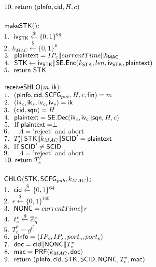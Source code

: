  $10.\  \mathsf{return}\ (\mathsf{pInfo}, \mathsf{cid}, H, c)$ \\
\\
\underline{$\mathsf{makeSTK}()$:} \\
 $1.\ \ \mathsf{iv}_{\mathsf{STK}} \xleftarrow{\$} \{0,1\}^{96}$ \\
 $2.\ \ k_{MAC} \xleftarrow{\$} \{0,1\}^{\mu}$ \\
 $3.\ \ \mathsf{plaintext} = IP_c \| currentTime \| k_{\mathsf{MAC}}$ \\
 $4.\ \ \mathsf{STK} \leftarrow \mathsf{iv}_{\mathsf{STK}} \| \mathsf{SE}.\mathsf{Enc}(k_{\mathsf{STK}}, len, \mathsf{iv}_{\mathsf{STK}}, \mathsf{plaintext})$ \\
 $5.\ \ \mathsf{return}\ \mathsf{STK}$ \\
\\
\underline{$\mathsf{receiveSHLO}(m, \mathsf{ik})$:} \\
 $1.\ \ (\mathsf{pInfo}, \mathsf{cid}, \mathsf{SCFG}_{pub}, H, c, \mathsf{fin}) = m$ \\
 $2.\ \ (\mathsf{ik}_c, \mathsf{ik}_s, \mathsf{iv}_c, \mathsf{iv}_s) = \mathsf{ik}$ \\
 $3.\ \ (\mathsf{cid}, \mathsf{sqn}) = H$ \\
 $4.\ \ \mathsf{plaintext} = \mathsf{SE}.\mathsf{Dec}(\mathsf{ik}_c, \mathsf{iv}_c \| \mathsf{sqn}, H, c)$ \\
 $5.\ \ \text{If }\mathsf{plaintext} = \perp$ \\
 $6.\ \ \quad \Lambda = \text{'reject' and abort}$ \\
 $7.\ \ T_{s}^{\prime} \| \mathsf{STK} \| k_{MAC} \| \mathsf{SCID}^{\prime} = \mathsf{plaintext} $ \\
 $8.\ \ \text{If }\mathsf{SCID}^{\prime} \neq \mathsf{SCID}$ \\
 $9.\ \ \quad \Lambda = \text{'reject' and abort}$ \\
 $10.\  \mathsf{return}\ T_s^{\prime}$ \\
\\
\underline{$\mathsf{CHLO}(\mathsf{STK}, \mathsf{SCFG}_{pub}, k_{MAC})$:} \\
 $1.\ \ \mathsf{cid} \xleftarrow{\$} \{0,1\}^{64}$ \\
 $2.\ \ r \xleftarrow{\$} \{0,1\}^{160}$ \\
 $3.\ \ \mathsf{NONC} = currentTime \| r$ \\
 $4.\ \ t_c^{\ast} \xleftarrow{\$} \mathbb{Z}_{q}^{\ast}$ \\
 $5.\ \ T_c^{\ast} = g^{t_c^{\ast}}$ \\
 $6.\ \ \mathsf{pInfo} = (IP_c, IP_s, port_c, port_s)$ \\
 $7.\ \ \mathsf{doc} = \mathsf{cid} \| \mathsf{NONC} \| T_c^{\ast}$ \\
 $8.\ \ \mathsf{mac} = \mathsf{PRF}(k_{MAC}, \mathsf{doc}) $ \\
 $9.\ \ \mathsf{return}\ (\mathsf{pInfo}, \mathsf{cid}, \mathsf{STK}, \mathsf{SCID}, \mathsf{NONC}, T_c^{\ast}, \mathsf{mac})$ \\
